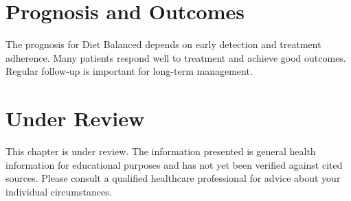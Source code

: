 \section*{Prognosis and Outcomes}
The prognosis for Diet Balanced depends on early detection and treatment adherence. Many patients respond well to treatment and achieve good outcomes. Regular follow-up is important for long-term management.
\section*{Under Review}
This chapter is under review. The information presented is general health information for educational purposes and has not yet been verified against cited sources. Please consult a qualified healthcare professional for advice about your individual circumstances.


\clearpage
